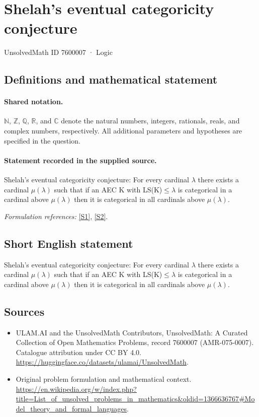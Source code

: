 \documentclass[11pt]{article}
\newcommand{\sref}[2]{\hyperlink{source:#1:#2}{[S#2]}}
\begin{document}
\setcounter{section}{7600006}
\section{Shelah's eventual categoricity conjecture}\label{7600007}
{\small UnsolvedMath ID 7600007 · Logic}
\subsection{Definitions and mathematical statement}

\paragraph{Shared notation.}$\mathbb N$, $\mathbb Z$, $\mathbb Q$, $\mathbb R$, and $\mathbb C$ denote the natural numbers, integers, rationals, reals, and complex numbers, respectively. All additional parameters and hypotheses are specified in the question.


\paragraph{Statement recorded in the supplied source.}
Shelah's eventual categoricity conjecture: For every cardinal $\lambda$ there exists a cardinal $\mu(\lambda)$ such that if an AEC K with LS(K)${} \le \lambda$ is categorical in a cardinal above $\mu(\lambda)$ then it is categorical in all cardinals above $\mu(\lambda)$.
\par\smallskip\textit{Formulation references:} \sref{7600007}{1}, \sref{7600007}{2}.
\subsection{Short English statement}
Shelah's eventual categoricity conjecture: For every cardinal $\lambda$ there exists a cardinal $\mu(\lambda)$ such that if an AEC K with LS(K)${} \le \lambda$ is categorical in a cardinal above $\mu(\lambda)$ then it is categorical in all cardinals above $\mu(\lambda)$.
\subsection{Sources}
\begin{itemize}
\item[\hypertarget{source:7600007:1}{S1}] ULAM.AI and the UnsolvedMath Contributors, UnsolvedMath: A Curated Collection of Open Mathematics Problems, record 7600007 (AMR-075-0007). Catalogue attribution under CC BY 4.0.
\url{https://huggingface.co/datasets/ulamai/UnsolvedMath}.
\item[\hypertarget{source:7600007:2}{S2}] Original problem formulation and mathematical context.
\url{https://en.wikipedia.org/w/index.php?title=List_of_unsolved_problems_in_mathematics&oldid=1366636767#Model_theory_and_formal_languages}.
\end{itemize}
\label{end:7600007}
\end{document}
